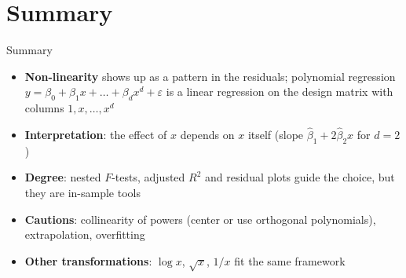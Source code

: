 \section{Summary}


\begin{frame}{Summary}
    \begin{itemize}
        \item \textbf{Non-linearity} shows up as a pattern in the residuals; polynomial regression $y = \beta_0 + \beta_1 x + \dots + \beta_d x^d + \varepsilon$ is a linear regression on the design matrix with columns $1, x, \dots, x^d$
        \item \textbf{Interpretation}: the effect of $x$ depends on $x$ itself (slope $\hat\beta_1 + 2\hat\beta_2 x$ for $d = 2$)%
        \item \textbf{Degree}: nested $F$-tests, adjusted $R^2$ and residual plots guide the choice, but they are in-sample tools
        \item \textbf{Cautions}: collinearity of powers (center or use orthogonal polynomials), extrapolation, overfitting
        \item \textbf{Other transformations}: $\log x$, $\sqrt{x}$, $1/x$ fit the same framework
    \end{itemize}
\end{frame}